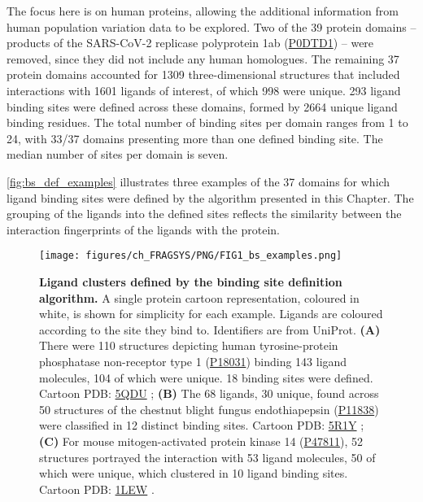 {The focus here is on human proteins, allowing the additional information from human population variation data to be explored. Two of the 39 protein domains -- products of the SARS-CoV-2 replicase polyprotein 1ab (\href{https://www.uniprot.org/uniprotkb/P0DTD1/entry}{P0DTD1}) -- were removed, since they did not include any human homologues. The remaining 37 protein domains accounted for 1309 three-dimensional structures that included interactions with 1601 ligands of interest, of which 998 were unique. 293 ligand binding sites were defined across these domains, formed by 2664 unique ligand binding residues. The total number of binding sites per domain ranges from 1 to 24, with 33/37 domains presenting more than one defined binding site. The median number of sites per domain is seven.

\autoref{fig:bs_def_examples} illustrates three examples of the 37 domains for which ligand binding sites were defined by the algorithm presented in this Chapter. The grouping of the ligands into the defined sites reflects the similarity between the interaction fingerprints of the ligands with the protein.

\begin{figure}[htb!]
    \centering
    \texttt{[image: figures/ch\_FRAGSYS/PNG/FIG1\_bs\_examples.png]}
    \caption[Ligand clusters defined by the binding site definition algorithm]{\textbf{Ligand clusters defined by the binding site definition algorithm.} A single protein cartoon representation, coloured in white, is shown for simplicity for each example. Ligands are coloured according to the site they bind to. Identifiers are from UniProt. \textbf{(A)} There were 110 structures depicting human tyrosine-protein phosphatase non-receptor type 1 (\href{https://www.uniprot.org/uniprotkb/P18031/entry}{P18031}) binding 143 ligand molecules, 104 of which were unique. 18 binding sites were defined. Cartoon PDB: \href{https://www.ebi.ac.uk/pdbe/entry/pdb/5qdu}{5QDU} \cite{KEEDY_2018_PTP1B}; \textbf{(B)} The 68 ligands, 30 unique, found across 50 structures of the chestnut blight fungus endothiapepsin (\href{https://www.uniprot.org/uniprotkb/P11838/entry}{P11838}) were classified in 12 distinct binding sites. Cartoon PDB: \href{https://www.ebi.ac.uk/pdbe/entry/pdb/5r1y}{5R1Y} \cite{WOLLENHAUPT_2020_F2X}; \textbf{(C)} For mouse mitogen-activated protein kinase 14 (\href{https://www.uniprot.org/uniprotkb/P47811/entry}{P47811}), 52 structures portrayed the interaction with 53 ligand molecules, 50 of which were unique, which clustered in 10 ligand binding sites. Cartoon PDB: \href{https://www.ebi.ac.uk/pdbe/entry/pdb/1lew}{1LEW} \cite{CHANG_2002_MapKinase}.}
    \label{fig:bs_def_examples}
\end{figure}

}

